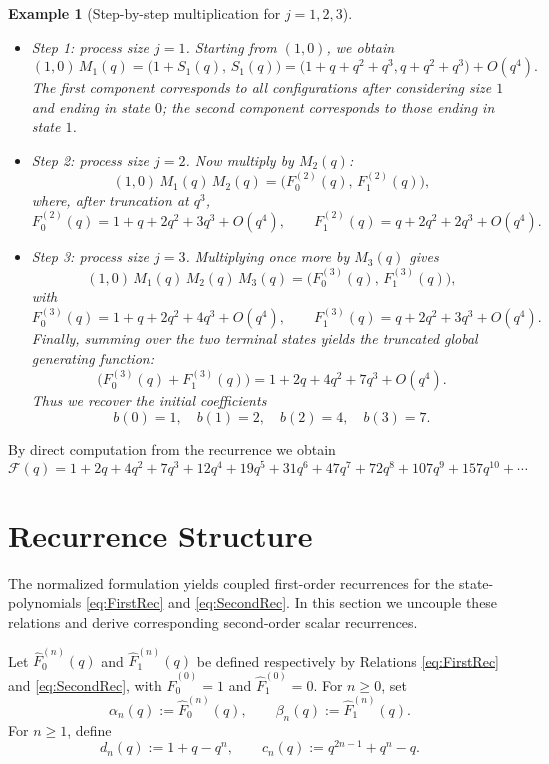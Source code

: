 \documentclass[letterpaper,12pt]{article}
\newtheorem{example}{Example}
\begin{document}
\begin{example}[Step-by-step multiplication for \(j=1,2,3\)]
\begin{itemize}
    \item Step 1: process size \(j=1\). 
    Starting from \((1,0)\), we obtain
\[
(1,0)\,M_1(q)
=
\bigl(1+S_1(q),\,S_1(q)\bigr)
=
\bigl(1+q+q^2+q^3, q+q^2+q^3\bigr) + O(q^4).
\]
The first component corresponds to all configurations after considering size \(1\)
and ending in state \(0\); the second component corresponds to those ending in
state \(1\).
\item Step 2: process size \(j=2\). Now multiply by \(M_2(q)\):
\[
(1,0)\,M_1(q)\,M_2(q)
=
\bigl(F_0^{(2)}(q),\,F_1^{(2)}(q)\bigr),
\]
where, after truncation at \(q^3\),
\[
F_0^{(2)}(q) = 1 + q + 2q^2 + 3q^3 + O(q^4),\qquad
F_1^{(2)}(q) = q + 2q^2 + 2q^3 + O(q^4).
\]
\item Step 3: process size \(j=3\). 
Multiplying once more by \(M_3(q)\) gives
\[
(1,0)\,M_1(q)\,M_2(q)\,M_3(q)
=
\bigl(F_0^{(3)}(q),\,F_1^{(3)}(q)\bigr),
\]
with
\[
F_0^{(3)}(q) = 1 + q + 2q^2 + 4q^3 + O(q^4),\qquad
F_1^{(3)}(q) = q + 2q^2 + 3q^3 + O(q^4).
\]
Finally, summing over the two terminal states yields the truncated global
generating function:
\[
\bigl(F_0^{(3)}(q) + F_1^{(3)}(q)\bigr)
=
1 + 2q + 4q^2 + 7q^3 + O(q^4).
\]
Thus we recover the initial coefficients
\[
b(0)=1,\quad b(1)=2,\quad b(2)=4,\quad b(3)=7.
\]

\end{itemize}

\end{example}

By direct computation from the recurrence we obtain
\[
\mathcal{F}(q) =
1 + 2q + 4q^2 + 7q^3 + 12q^4 + 19q^5 + 31q^6 + 47q^7 + 72q^8 + 107q^9 + 157q^{10} + \cdots
\]

 
\section{Recurrence Structure}\label{sec:Recurrence}
The normalized formulation yields coupled first-order recurrences for the state-polynomials \eqref{eq:FirstRec} and \eqref{eq:SecondRec}. 
In this section we uncouple these relations and derive corresponding second-order scalar recurrences.



Let $\widehat F^{(n)}_0(q)$ and $\widehat F^{(n)}_1(q)$ be defined respectively by Relations
\eqref{eq:FirstRec} and \eqref{eq:SecondRec}, with $\widehat F^{(0)}_0=1$ and $\widehat F^{(0)}_1=0$. For $n \ge 0$, set
\[
\alpha_n(q) := \widehat F^{(n)}_0(q),
\qquad
\beta_n(q) := \widehat F^{(n)}_1(q).
\]
For $n \ge 1$, define
\[
d_n(q) := 1 + q - q^n,
\qquad
c_n(q) := q^{2n-1} + q^n - q.
\]
\end{document}
